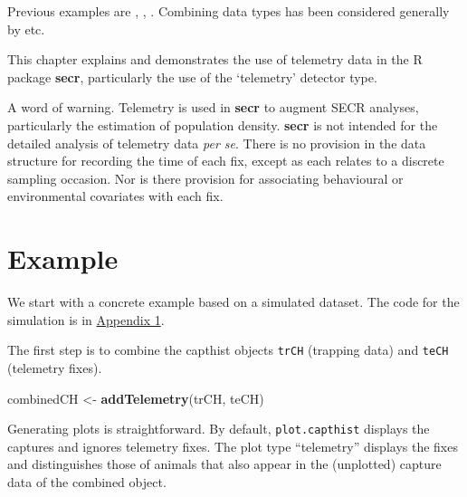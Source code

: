 \documentclass[
]{book}
\newenvironment{Shaded}{\begin{snugshade}}{\end{snugshade}}
\newcommand{\FunctionTok}[1]{\textcolor[rgb]{0.13,0.29,0.53}{\textbf{#1}}}
\newcommand{\NormalTok}[1]{#1}
\newcommand{\OtherTok}[1]{\textcolor[rgb]{0.56,0.35,0.01}{#1}}
\begin{document}
Previous examples are \citet{sgpsmspo13}, \citet{whc18}, \citet{Linden2018}. Combining data types has been considered generally by \citet{Gopalaswamy2012} etc.

This chapter explains and demonstrates the use of telemetry data in the R package \textbf{secr}, particularly the use of the `telemetry' detector type.

A word of warning. Telemetry is used in \textbf{secr} to augment SECR analyses, particularly the estimation of population density. \textbf{secr} is not intended for the detailed analysis of telemetry data \emph{per se}. There is no provision in the data structure for recording the time of each fix, except as each relates to a discrete sampling occasion. Nor is there provision for associating behavioural or environmental covariates with each fix.

\section{Example}\label{telemetryexample}

We start with a concrete example based on a simulated dataset. The code for the simulation is in \hyperref[telemetryappendix1]{Appendix 1}.

The first step is to combine the capthist objects \texttt{trCH} (trapping data) and \texttt{teCH} (telemetry fixes).

\begin{Shaded}
\begin{Highlighting}[]
\NormalTok{combinedCH }\OtherTok{\textless{}{-}} \FunctionTok{addTelemetry}\NormalTok{(trCH, teCH)}
\end{Highlighting}
\end{Shaded}

Generating plots is straightforward. By default, \texttt{plot.capthist} displays the captures and ignores telemetry fixes. The plot type ``telemetry'' displays the fixes and distinguishes those of animals that also appear in the (unplotted) capture data of the combined object.
\end{document}

